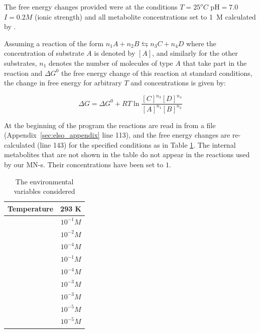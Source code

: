 \documentclass[a4paper,12pt]{article}
\begin{document}
	The free energy changes provided were at the conditions $T=25 ^o C$ pH$=7.0$ $I=0.2 M$ (ionic strength) and all metabolite concentrations set to 1~M calculated by \cite{BartekLower}. 
	
	Assuming a reaction of the form $n_1A + n_2B \leftrightarrows n_3C + n_4D$ where the concentration of substrate $A$ is denoted by $[A]$, and similarly for the other substrates, $n_1$ denotes the number of molecules of type $A$ that take part in the reaction and $\Delta G^0$ the free energy change of this reaction at standard conditions, the change in free energy for arbitrary $T$ and concentrations is given by: 
	
	\begin{equation}\label{eq:freeechange}
		\Delta G = \Delta G^0 + R T \ln \frac{[C]^{n_3}[D]^{n_4}}{[A]^{n_1}[B]^{n_2}}
	\end{equation}
	
	At the beginning of the program the reactions are read in from a file (Appendix~\ref{sec:elso_appendix} line 113), and the free energy changes are re-calculated (line 143) for the specified conditions as in Table \ref{environmentTable}. The internal metabolites that are not shown in the table do not appear in the reactions used by our MN-s. Their concentrations have been set to $1$. 
	
	\begin{table}
		\centering
	\begin{tabular}{|c|c|}
		
		\hline Temperature & 293 K \\ 
		\hline [ATP] & $10^{-1} M$ \\ 
		\hline [ADP] & $10^{-2} M$ \\ 
		\hline [AMP] & $10^{-4} M$ \\ 
		\hline [NAD$^+$] & $10^{-1} M$ \\ 
		\hline [NADH] & $10^{-4} M$ \\ 
		\hline [Pi] & $10^{-3} M$\\ 
		\hline [PPi] & $10^{-3} M$ \\ 
		\hline [CO$_2$] & $10^{-5} M$ \\ 
		\hline [NH$_3$] & $10^{-5} M$ \\ 

		\hline 
	\end{tabular} 
	\caption{The environmental variables considered}
	\label{environmentTable}
	\end{table}
\end{document}
